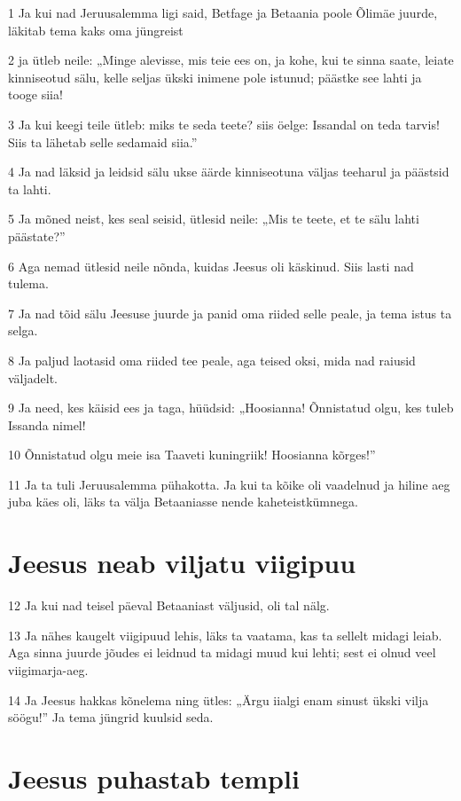 \par 1 Ja kui nad Jeruusalemma ligi said, Betfage ja Betaania poole Õlimäe juurde, läkitab tema kaks oma jüngreist
\par 2 ja ütleb neile: „Minge alevisse, mis teie ees on, ja kohe, kui te sinna saate, leiate kinniseotud sälu, kelle seljas ükski inimene pole istunud; päästke see lahti ja tooge siia!
\par 3 Ja kui keegi teile ütleb: miks te seda teete? siis öelge: Issandal on teda tarvis! Siis ta lähetab selle sedamaid siia.”
\par 4 Ja nad läksid ja leidsid sälu ukse äärde kinniseotuna väljas teeharul ja päästsid ta lahti.
\par 5 Ja mõned neist, kes seal seisid, ütlesid neile: „Mis te teete, et te sälu lahti päästate?”
\par 6 Aga nemad ütlesid neile nõnda, kuidas Jeesus oli käskinud. Siis lasti nad tulema.
\par 7 Ja nad tõid sälu Jeesuse juurde ja panid oma riided selle peale, ja tema istus ta selga.
\par 8 Ja paljud laotasid oma riided tee peale, aga teised oksi, mida nad raiusid väljadelt.
\par 9 Ja need, kes käisid ees ja taga, hüüdsid: „Hoosianna! Õnnistatud olgu, kes tuleb Issanda nimel!
\par 10 Õnnistatud olgu meie isa Taaveti kuningriik! Hoosianna kõrges!”
\par 11 Ja ta tuli Jeruusalemma pühakotta. Ja kui ta kõike oli vaadelnud ja hiline aeg juba käes oli, läks ta välja Betaaniasse nende kaheteistkümnega.

\section*{Jeesus neab viljatu viigipuu}

\par 12 Ja kui nad teisel päeval Betaaniast väljusid, oli tal nälg.
\par 13 Ja nähes kaugelt viigipuud lehis, läks ta vaatama, kas ta sellelt midagi leiab. Aga sinna juurde jõudes ei leidnud ta midagi muud kui lehti; sest ei olnud veel viigimarja-aeg.
\par 14 Ja Jeesus hakkas kõnelema ning ütles: „Ärgu iialgi enam sinust ükski vilja söögu!” Ja tema jüngrid kuulsid seda.

\section*{Jeesus puhastab templi}

